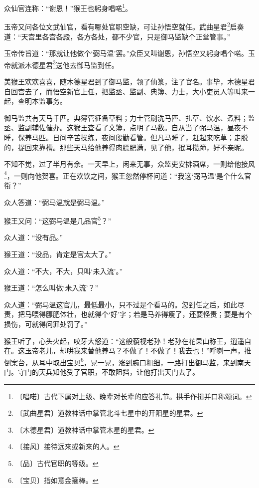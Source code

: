 \documentclass[12pt,UTF-8,openany]{ctexbook}
\begin{document}
\begin{large}
    众仙官连称：“谢恩！”猴王也躬身唱喏\footnote{〔唱喏〕古代下属对上级、晚辈对长辈的应答礼节。拱手作揖并口称颂词。}。
    
    玉帝又问各位文武仙官，看有哪处官职空缺，可让孙悟空就任。武曲星君\footnote{〔武曲星君〕道教神话中掌管北斗七星中的开阳星的星君。}启奏道：“天宫里各宫各殿，各方各处，都不少官，只是御马监缺个正堂管事。”
    
    玉帝传旨道：“那就让他做个‘弼马温’罢。”众臣又叫谢恩，孙悟空又躬身唱个喏。玉帝就派木德星君\footnote{〔木德星君〕道教神话中掌管木星的星君。}送他去御马监到任。
    
    美猴王欢欢喜喜，随木德星君到了御马监，领了仙箓，注了官名。事毕，木德星君自回宫去了，而悟空新官上任，把监丞、监副、典簿、力士，大小吏员人等叫来一起，查明本监事务。
    
    御马监共有天马千匹。典簿管征备草料；力士管刷洗马匹、扎草、饮水、煮料；监丞、监副辅佐催办。这猴王查看了文簿，点明了马数。自从当了弼马温，昼夜不睡，保养马匹。日间辛苦操练，夜间殷勤看管。但凡马睡了，赶起来吃草；走脱的，捉回来靠槽。那些天马给他养得肉膘肥满，见了他，抿耳攒蹄，好不亲昵。
    
    不知不觉，过了半月有余。一天早上，闲来无事，众监吏安排酒席，一则给他接风\footnote{〔接风〕接待远来或新来的人。}，一则向他贺喜。正在欢饮之间，猴王忽然停杯问道：“我这‘弼马温’是个什么官衔？”
    
    众人答道：“弼马温就是弼马温。”
    
    猴王又问：“这弼马温是几品官\footnote{〔品〕古代官职的等级。}？”
    
    众人道：“没有品。”
    
    猴王道：“没品，肯定是官太大了。”
    
    众人道：“不大，不大，只叫‘未入流’。”
    
    猴王道：“怎么叫做‘未入流’？”
    
    众人道：“弼马温这官儿，最低最小，只不过是个看马的。您到任之后，如此尽责，把马喂得膘肥体壮，也就得个‘好’字；若是马养得瘦了，还要怪责；要是有个损伤，可就得问罪处罚了。”
    
    猴王听了，心头火起，咬牙大怒道：“这般藐视老孙！老孙在花果山称王，逍遥自在。这玉帝老儿，却哄我来替他养马？不做了！不做了！我去也！”呼喇一声，推倒案台，从耳中取出宝贝\footnote{〔宝贝〕指如意金箍棒。}，晃一晃，涨到腕口粗细，一路打出御马监，来到南天门。守门的天兵知他受了官职，不敢阻挡，让他打出天门去了。
    
\end{large}


\newpage
\end{document}
